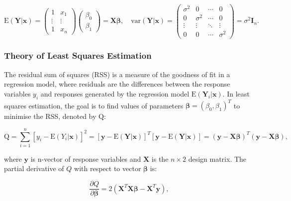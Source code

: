 \documentclass{article}\usepackage[]{graphicx}\usepackage[]{xcolor}
\numberwithin{equation}{section}
\begin{document}
\begin{equation}\label{eq:4-2}
\mathrm{E}(\mathbf{Y} | \mathbf{x}) = 
\left( \begin{array}{cc}
1 & x_1\\
\vdots& \vdots\\
1 & x_n
\end{array} \right) 
\left( \begin{array}{cc}
\beta_0 \\
\beta_1
\end{array} \right) = \mathbf{X} \boldsymbol{\beta}, \quad 
\text{var}(\mathbf{Y} | \mathbf{x}) =
\begin{pmatrix}
\sigma^2 & 0 & \cdots & 0 \\
0 & \sigma^2 & \cdots & 0 \\
\vdots & \vdots & \ddots & \vdots \\
0 & 0 & \cdots & \sigma^2
\end{pmatrix} = \sigma^2 \mathbf{I}_n.
\end{equation}

\subsubsection{Theory of Least Squares Estimation}

\noindent The residual sum of squares (RSS) is a measure of the goodness of fit in a regression model, where residuals are the differences between the response variables $y_i$ and responses generated by the regression model $\mathrm{E}(\mathbf{Y}_i | \mathbf{x})$. In least squares estimation, the goal is to find values of parameters $\boldsymbol{\beta} = (\beta_0, \beta_1)^T$ to minimise the RSS, denoted by $\mathrm{Q}$: 

\begin{equation}\label{eq:4-3}
\mathrm{Q} = \sum_{i=1}^{n} [y_i - \mathrm{E} (Y_i | \mathbf{x})]^2 
           = [\mathbf{y}- \mathrm{E} (\mathbf{Y} | \mathbf{x})]^{T} [\mathbf{y}- \mathrm{E} (\mathbf{Y} | \mathbf{x})] 
           = (\mathbf{y}- \mathbf{X} \boldsymbol{\beta})^{T} (\mathbf{y}- \mathbf{X} \boldsymbol{\beta}),
\end{equation}

\noindent
where $\mathbf{y}$ is n-vector of response variables and $\mathbf{X}$ is the $n \times 2$ design matrix. The partial derivative of $Q$ with respect to vector $\boldsymbol{\beta}$ is:

\begin{equation}\label{eq:4-4}
\frac{\partial Q}{\partial \boldsymbol{\beta}} = 2(\mathbf{X}^T\mathbf{X} \boldsymbol{\beta} - \mathbf{X}^T\mathbf{y}),
\end{equation}
\end{document}
